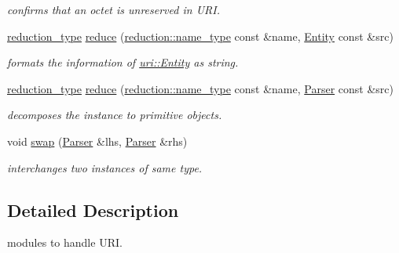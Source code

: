 \begin{DoxyCompactItemize}
\begin{DoxyCompactList}\small\item\em confirms that an octet is unreserved in U\-R\-I. \end{DoxyCompactList}\item 
\hypertarget{namespacehryky_1_1uri_ab4530b241565d82fb0768bb29031858f}{\hyperlink{namespacehryky_a343a9a4c36a586be5c2693156200eadc}{reduction\-\_\-type} \hyperlink{namespacehryky_1_1uri_ab4530b241565d82fb0768bb29031858f}{reduce} (\hyperlink{namespacehryky_1_1reduction_ac686c30a4c8d196bbd0f05629a6b921f}{reduction\-::name\-\_\-type} const \&name, \hyperlink{classhryky_1_1uri_1_1_entity}{Entity} const \&src)}\label{namespacehryky_1_1uri_ab4530b241565d82fb0768bb29031858f}

\begin{DoxyCompactList}\small\item\em formats the information of \hyperlink{classhryky_1_1uri_1_1_entity}{uri\-::\-Entity} as string. \end{DoxyCompactList}\item 
\hypertarget{namespacehryky_1_1uri_a33d37a98b8d35fad8dbc9677b61d44ee}{\hyperlink{namespacehryky_a343a9a4c36a586be5c2693156200eadc}{reduction\-\_\-type} \hyperlink{namespacehryky_1_1uri_a33d37a98b8d35fad8dbc9677b61d44ee}{reduce} (\hyperlink{namespacehryky_1_1reduction_ac686c30a4c8d196bbd0f05629a6b921f}{reduction\-::name\-\_\-type} const \&name, \hyperlink{classhryky_1_1uri_1_1_parser}{Parser} const \&src)}\label{namespacehryky_1_1uri_a33d37a98b8d35fad8dbc9677b61d44ee}

\begin{DoxyCompactList}\small\item\em decomposes the instance to primitive objects. \end{DoxyCompactList}\item 
void \hyperlink{namespacehryky_1_1uri_a385681623309ce37d502b7efea1bf924}{swap} (\hyperlink{classhryky_1_1uri_1_1_parser}{Parser} \&lhs, \hyperlink{classhryky_1_1uri_1_1_parser}{Parser} \&rhs)
\begin{DoxyCompactList}\small\item\em interchanges two instances of same type. \end{DoxyCompactList}\end{DoxyCompactItemize}


\subsection{Detailed Description}
modules to handle U\-R\-I. 

